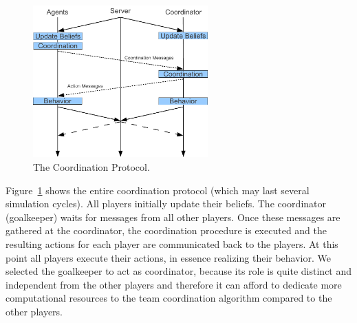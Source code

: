 \begin{figure}[t!]
\centering
  \includegraphics[width=0.6\textwidth]{Chapter4/figures/CoordinationCycle.pdf}
  \caption{The Coordination Protocol.} 
  \label{fig:CoordinationCycle}
\end{figure}


Figure~\ref{fig:CoordinationCycle} shows the entire coordination protocol (which may last several simulation cycles). All players initially update their beliefs. The coordinator (goalkeeper) waits for messages from all other players. Once these messages are gathered at the coordinator, the coordination procedure is executed and the resulting actions for each player are communicated back to the players. At this point all players execute their actions, in essence realizing their behavior. We selected the goalkeeper to act as coordinator, because its role is quite distinct and independent from the other players and therefore it can afford to dedicate more computational resources to the team coordination algorithm compared to the other players. 

